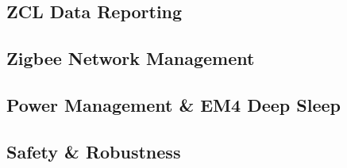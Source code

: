 \subsection{ZCL Data Reporting} \label{sec:ZCL_Data_Reporting}


\subsection{Zigbee Network Management} \label{sec:Zigbee_Network_Management}


\subsection{Power Management \& EM4 Deep Sleep} \label{sec:Power_Management_&_EM4_Deep_Sleep}


\subsection{Safety \& Robustness} \label{sec:Safety_&_Robustness}

